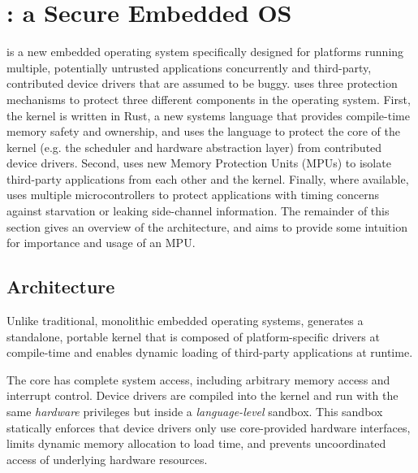 \section{\name: a Secure Embedded OS}
\label{sec:os}

\name is a new embedded operating system
specifically designed for platforms running multiple, potentially untrusted
applications concurrently and third-party, contributed device drivers that are
assumed to be buggy. \name uses three protection mechanisms to protect three
different components in the operating system.
First, the kernel is written in Rust, a new systems language that provides
compile-time memory safety and ownership, and uses the language to protect the
core of the kernel (e.g. the scheduler and hardware abstraction layer) from
contributed device drivers.
Second, \name uses new Memory Protection Units (MPUs) to isolate third-party
applications from each other and the kernel.
Finally, where available, \name uses multiple microcontrollers to protect
applications with timing concerns against starvation or leaking side-channel
information.
The remainder of this section gives an overview of the \name architecture,
and aims to provide some intuition for importance and usage of an MPU.

\subsection{Architecture}
\label{sec:os-arch}


Unlike traditional, monolithic embedded operating systems, \name generates a
standalone, portable kernel that is composed of platform-specific drivers at
compile-time and enables dynamic loading of third-party applications at
runtime.

The \name core has complete system access, including arbitrary memory
access and interrupt control. Device drivers are compiled into the kernel and
run with the same \emph{hardware} privileges but inside a
\emph{language-level} sandbox. This sandbox statically enforces that device
drivers only use core-provided hardware interfaces, limits dynamic memory
allocation to load time, and prevents uncoordinated access of underlying
hardware resources.

